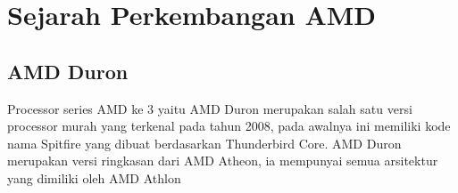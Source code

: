 \section{Sejarah Perkembangan AMD}
\subsection{AMD Duron}
	Processor series AMD ke 3 yaitu AMD Duron merupakan salah satu versi processor murah yang terkenal pada tahun 2008, pada awalnya ini memiliki kode nama Spitfire yang dibuat berdasarkan Thunderbird Core. AMD Duron merupakan versi ringkasan dari AMD Atheon, ia mempunyai semua arsitektur yang dimiliki oleh AMD  Athlon